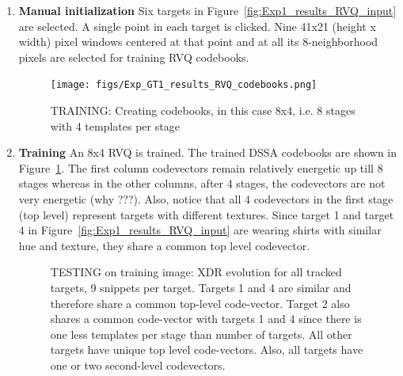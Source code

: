 \documentclass[12pt,letterpaper,doublespaced,ETD]{gt-ece-thesis} %
\begin{document}
\begin{Body}
\begin{enumerate}
	\item \textbf{Manual initialization}  Six targets in Figure~\ref{fig:Exp1_results_RVQ_input} are selected.  A single point in each target is clicked.  Nine 41x21 (height x width) pixel windows centered at that point and at all its 8-neighborhood pixels are selected for training RVQ codebooks.

\begin{figure}[h]
\centering
\texttt{[image: figs/Exp\_GT1\_results\_RVQ\_codebooks.png]}
\caption{TRAINING: Creating codebooks, in this case 8x4, i.e. 8 stages with 4 templates per stage}
\label{fig:Exp1_results_RVQ_codebooks}
\end{figure}


	\item \textbf{Training} An 8x4 RVQ is trained.  The trained DSSA codebooks are shown in  Figure~\ref{fig:Exp1_results_RVQ_codebooks}.  The first column codevectors remain relatively energetic up till 8 stages whereas in the other columns, after 4 stages, the codevectors are not very energetic (why ???).  Also, notice that all 4 codevectors in the first stage (top level) represent targets with different textures.  Since target 1 and target 4 in Figure~\ref{fig:Exp1_results_RVQ_input} are wearing shirts with similar hue and texture, they share a common top level codevector.  

 \begin{figure}
\centering	
{}
\caption{TESTING on training image: XDR evolution for all tracked targets, 9 snippets per target.  Targets 1 and 4 are similar and therefore share a common top-level code-vector.  Target 2 also shares a common code-vector with targets 1 and 4 since there is one less templates per stage than number of targets.  All other targets have unique top level code-vectors.  Also, all targets have one or two second-level codevectors.}		
\label{fig:Exp1_results_RVQ_XDRevolution}				
\end{figure}


\end{enumerate}
\end{Body}
\end{document}
